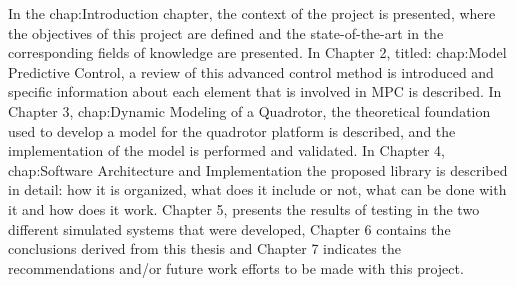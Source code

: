 In the {chap:Introduction} chapter, the context of the project is presented, where the objectives of this project are defined and the state-of-the-art in the corresponding fields of knowledge are presented. In Chapter 2, titled: {chap:Model Predictive Control}, a review of this advanced control method is introduced and specific information about each element that is involved in MPC is described. In Chapter 3, {chap:Dynamic Modeling of a Quadrotor}, the theoretical foundation used to develop a model for the quadrotor platform is described, and the implementation of the model is performed and validated. In Chapter 4, {chap:Software Architecture and Implementation} the proposed library is described in detail: how it is organized, what does it include or not, what can be done with it and how does it work. Chapter 5, presents the results of testing in the two different simulated systems that were developed, Chapter 6 contains the conclusions derived from this thesis and Chapter 7 indicates the recommendations and/or future work efforts to be made with this project.  

 	




 
